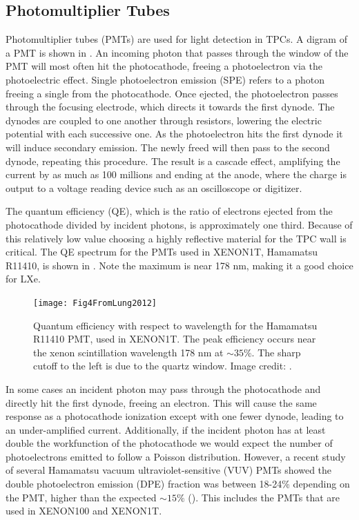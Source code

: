 \subsection{Photomultiplier Tubes}
\label{subsec:tpcs_pmts}
Photomultiplier tubes (PMTs) are used for light detection in TPCs.  A digram of a PMT is shown in .  An
incoming photon that
passes through the window of the PMT will most often hit the photocathode, freeing a photoelectron via the photoelectric effect.  Single
photoelectron emission (SPE) refers to a photon freeing a single \electron from the photocathode.  Once ejected, the photoelectron passes
through the focusing
electrode, which directs it towards the first dynode.  The dynodes are coupled to one another through resistors, lowering the electric
potential with each successive one.  As the photoelectron hits the first dynode it will induce secondary emission.  The newly freed
\electron will then pass to the
second dynode, repeating this procedure.  The result is a cascade effect, amplifying the current by as much as 100 millions and ending
at the anode, where the charge is output to a voltage reading device such as an oscilloscope or digitizer.

The
quantum efficiency (QE), which is the ratio of electrons ejected from the photocathode divided by incident photons, is approximately
one third.  Because of this relatively low value choosing a highly reflective material for the TPC wall is critical.  The QE spectrum for
the PMTs used in XENON1T, Hamamatsu R11410, is shown in .  Note the maximum is near 178 nm, making it a good
choice for LXe.  

\begin{figure}
\centering
\texttt{[image: Fig4FromLung2012]}
\caption{Quantum efficiency with respect to wavelength for the Hamamatsu R11410 PMT, used in XENON1T.  The peak efficiency occurs near
the xenon scintillation wavelength 178 nm at $\sim 35 \%$.  The sharp cutoff to the left is due to the quartz window.  Image credit:
.}
\label{fig:tpcs_pmts_qe}
\end{figure}

In some cases an incident photon may pass through the photocathode and directly hit the first dynode, freeing an electron.  This will
cause the same response as a photocathode ionization except with one fewer dynode, leading to an under-amplified current.  Additionally,
if the incident photon has at least double the workfunction of the photocathode we would expect the number of photoelectrons emitted to
follow a Poisson distribution.  However, a recent study of several Hamamatsu vacuum ultraviolet-sensitive (VUV) PMTs showed the double
photoelectron emission
(DPE) fraction was between 18-24\% depending on the PMT, higher than the expected $\sim 15\%$ ().  This includes the
PMTs that are used in XENON100 and XENON1T.

